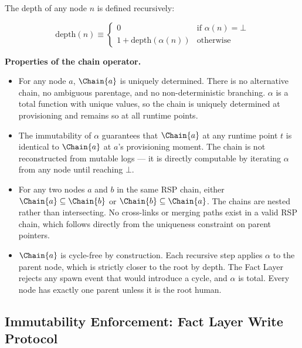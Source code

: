 The depth of any node $n$ is defined recursively:

\begin{equation}
\mathrm{depth}(n) \equiv
\begin{cases}
0 & \text{if } \alpha(n) = \bot \\
1 + \mathrm{depth}(\alpha(n)) & \text{otherwise}
\end{cases}
\label{eq:depth-definition}
\end{equation}

\medskip
\noindent\textbf{Properties of the chain operator.}

\begin{itemize}
    \item[(C1) \textbf{Determinism}] For any node $a$, $\Chain{a}$ is uniquely determined. There is no alternative chain, no ambiguous parentage, and no non-deterministic branching. $\alpha$ is a total function with unique values, so the chain is uniquely determined at provisioning and remains so at all runtime points.
    \item[(C2) \textbf{Stability}] The immutability of $\alpha$ guarantees that $\Chain{a}$ at any runtime point $t$ is identical to $\Chain{a}$ at $a$'s provisioning moment. The chain is not reconstructed from mutable logs — it is directly computable by iterating $\alpha$ from any node until reaching $\bot$.
    \item[(C3) \textbf{Compositionality}] For any two nodes $a$ and $b$ in the same RSP chain, either $\Chain{a} \subseteq \Chain{b}$ or $\Chain{b} \subseteq \Chain{a}$. The chains are nested rather than intersecting. No cross-links or merging paths exist in a valid RSP chain, which follows directly from the uniqueness constraint on parent pointers.
    \item[(C4) \textbf{Acyclicity}] $\Chain{a}$ is cycle-free by construction. Each recursive step applies $\alpha$ to the parent node, which is strictly closer to the root by depth. The Fact Layer rejects any spawn event that would introduce a cycle, and $\alpha$ is total. Every node has exactly one parent unless it is the root human.
\end{itemize}

\subsection{Immutability Enforcement: Fact Layer Write Protocol}
\label{sec:fact-layer-enforcement}

